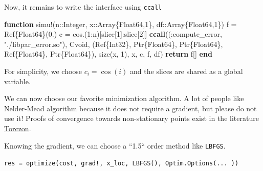\documentclass[11pt]{article}
\newenvironment{Shaded}{}{}
\newcommand{\KeywordTok}[1]{\textcolor[rgb]{0.00,0.44,0.13}{\textbf{{#1}}}}
\newcommand{\DataTypeTok}[1]{\textcolor[rgb]{0.56,0.13,0.00}{{#1}}}
\newcommand{\FloatTok}[1]{\textcolor[rgb]{0.25,0.63,0.44}{{#1}}}
\newcommand{\StringTok}[1]{\textcolor[rgb]{0.25,0.44,0.63}{{#1}}}
\newcommand{\NormalTok}[1]{{#1}}
\newcommand{\OperatorTok}[1]{\textcolor[rgb]{0.40,0.40,0.40}{{#1}}}
\begin{document}
Now, it remains to write the interface using \texttt{ccall}

\begin{Shaded}
\begin{Highlighting}[]
\KeywordTok{function}\NormalTok{ simu}\OperatorTok{!}\NormalTok{(n}\OperatorTok{::}\DataTypeTok{Integer}\OperatorTok{,}\NormalTok{ x}\OperatorTok{::}\DataTypeTok{Array}\NormalTok{\{}\DataTypeTok{Float64}\OperatorTok{,}\FloatTok{1}\NormalTok{\}}\OperatorTok{,}\NormalTok{ df}\OperatorTok{::}\DataTypeTok{Array}\NormalTok{\{}\DataTypeTok{Float64}\OperatorTok{,}\FloatTok{1}\NormalTok{\})}
\NormalTok{  f }\OperatorTok{=} \DataTypeTok{Ref}\NormalTok{\{}\DataTypeTok{Float64}\NormalTok{\}(}\FloatTok{0}\NormalTok{.)}
\NormalTok{  c }\OperatorTok{=}\NormalTok{ cos.(}\FloatTok{1}\OperatorTok{:}\NormalTok{n)[slice[}\FloatTok{1}\NormalTok{]}\OperatorTok{:}\NormalTok{slice[}\FloatTok{2}\NormalTok{]]}
  \KeywordTok{ccall}\NormalTok{((}\OperatorTok{:}\NormalTok{compute\_error}\OperatorTok{,} \StringTok{"./libpar\_error.so"}\NormalTok{)}\OperatorTok{,} 
\NormalTok{  Cvoid}\OperatorTok{,}\NormalTok{ (}\DataTypeTok{Ref}\NormalTok{\{}\DataTypeTok{Int32}\NormalTok{\}}\OperatorTok{,} \DataTypeTok{Ptr}\NormalTok{\{}\DataTypeTok{Float64}\NormalTok{\}}\OperatorTok{,} \DataTypeTok{Ptr}\NormalTok{\{}\DataTypeTok{Float64}\NormalTok{\}}\OperatorTok{,} \DataTypeTok{Ref}\NormalTok{\{}\DataTypeTok{Float64}\NormalTok{\}}\OperatorTok{,} \DataTypeTok{Ptr}\NormalTok{\{}\DataTypeTok{Float64}\NormalTok{\})}\OperatorTok{,}\NormalTok{ size(x}\OperatorTok{,} \FloatTok{1}\NormalTok{)}\OperatorTok{,}\NormalTok{ x}\OperatorTok{,}\NormalTok{ c}\OperatorTok{,}\NormalTok{ f}\OperatorTok{,}\NormalTok{ df)}
  \KeywordTok{return}\NormalTok{ f[]}
\KeywordTok{end}
\end{Highlighting}
\end{Shaded}

For simplicity, we choose \(c_i = \cos(i)\) and the slices are shared as
a global variable.

We can now choose our favorite minimization algorithm. A lot of people
like Nelder-Mead algorithm because it does not require a gradient, but
please do not use it! Proofs of convergence towards non-stationary
points exist in the literature \href{http://citeseerx.ist.psu.edu/viewdoc/summary?doi=10.1.1.48.9967}{Torczon}.

Knowing the gradient, we can choose a ``1.5`` order method like \texttt{LBFGS}.

\texttt{res\ =\ optimize(cost,\ grad!,\ x\_loc,\ LBFGS(),\ Optim.Options(...\ ))}
\end{document}
